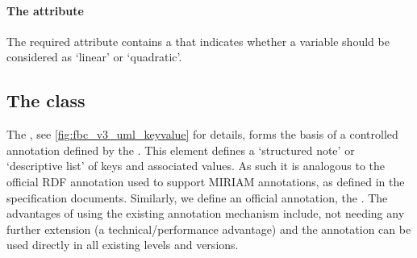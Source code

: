\paragraph{The  attribute}
The required  attribute contains a  that indicates whether a variable should be considered as `linear' or `quadratic'.


\subsection{The \FBC {} class}
\label{listofkeyvaluepairs-class}

The \ListOfKeyValuePairs, see \ref{fig:fbc_v3_uml_keyvalue} for details, forms the basis of a controlled annotation defined by the \FBCPackage. This element defines a `structured note' or `descriptive list' of keys and associated values.
%
%
As such it is analogous to the official \SBML RDF annotation used to support MIRIAM annotations, as defined in the \SBML specification documents. Similarly, we define an official \FBC annotation, the \ListOfKeyValuePairs. The advantages of using the existing \SBML annotation mechanism include, \SBase not needing any further extension (a technical/performance advantage) and the annotation can be used directly in all existing \SBML levels and versions.

